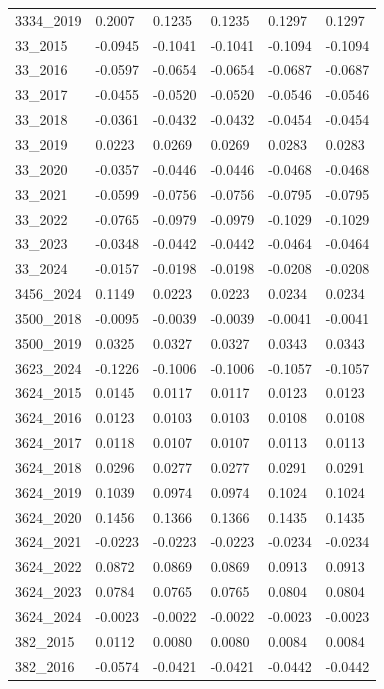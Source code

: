 \begin{table}[htbp]
\begin{tabular}{llllll}
3334_2019 & 0.2007 & 0.1235 & 0.1235 & 0.1297 & 0.1297 \\
33_2015 & -0.0945 & -0.1041 & -0.1041 & -0.1094 & -0.1094 \\
33_2016 & -0.0597 & -0.0654 & -0.0654 & -0.0687 & -0.0687 \\
33_2017 & -0.0455 & -0.0520 & -0.0520 & -0.0546 & -0.0546 \\
33_2018 & -0.0361 & -0.0432 & -0.0432 & -0.0454 & -0.0454 \\
33_2019 & 0.0223 & 0.0269 & 0.0269 & 0.0283 & 0.0283 \\
33_2020 & -0.0357 & -0.0446 & -0.0446 & -0.0468 & -0.0468 \\
33_2021 & -0.0599 & -0.0756 & -0.0756 & -0.0795 & -0.0795 \\
33_2022 & -0.0765 & -0.0979 & -0.0979 & -0.1029 & -0.1029 \\
33_2023 & -0.0348 & -0.0442 & -0.0442 & -0.0464 & -0.0464 \\
33_2024 & -0.0157 & -0.0198 & -0.0198 & -0.0208 & -0.0208 \\
3456_2024 & 0.1149 & 0.0223 & 0.0223 & 0.0234 & 0.0234 \\
3500_2018 & -0.0095 & -0.0039 & -0.0039 & -0.0041 & -0.0041 \\
3500_2019 & 0.0325 & 0.0327 & 0.0327 & 0.0343 & 0.0343 \\
3623_2024 & -0.1226 & -0.1006 & -0.1006 & -0.1057 & -0.1057 \\
3624_2015 & 0.0145 & 0.0117 & 0.0117 & 0.0123 & 0.0123 \\
3624_2016 & 0.0123 & 0.0103 & 0.0103 & 0.0108 & 0.0108 \\
3624_2017 & 0.0118 & 0.0107 & 0.0107 & 0.0113 & 0.0113 \\
3624_2018 & 0.0296 & 0.0277 & 0.0277 & 0.0291 & 0.0291 \\
3624_2019 & 0.1039 & 0.0974 & 0.0974 & 0.1024 & 0.1024 \\
3624_2020 & 0.1456 & 0.1366 & 0.1366 & 0.1435 & 0.1435 \\
3624_2021 & -0.0223 & -0.0223 & -0.0223 & -0.0234 & -0.0234 \\
3624_2022 & 0.0872 & 0.0869 & 0.0869 & 0.0913 & 0.0913 \\
3624_2023 & 0.0784 & 0.0765 & 0.0765 & 0.0804 & 0.0804 \\
3624_2024 & -0.0023 & -0.0022 & -0.0022 & -0.0023 & -0.0023 \\
382_2015 & 0.0112 & 0.0080 & 0.0080 & 0.0084 & 0.0084 \\
382_2016 & -0.0574 & -0.0421 & -0.0421 & -0.0442 & -0.0442 \\

\end{tabular}
\end{table}
